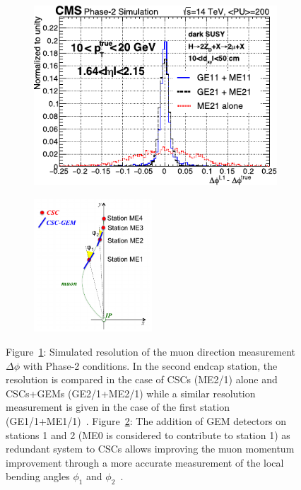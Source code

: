 	\begin{figure}[H]
		\begin{subfigure}{0.5\linewidth}
			\centering
			\includegraphics[width=.9\linewidth]{fig/chapt3/GEM-muon-direction.pdf}
			\caption{\label{fig:GEM-Muon:A}}
		\end{subfigure}
		\begin{subfigure}{0.5\linewidth}
			\centering
			\includegraphics[height=5cm]{fig/chapt3/GEM-muon-bending.png}
			\caption{\label{fig:GEM-Muon:B}}
		\end{subfigure}
		\caption{\label{fig:GEM-Muon} Figure~\ref{fig:GEM-Muon:A}: Simulated resolution of the muon direction measurement $\Delta\phi$ with Phase-2 conditions. In the second endcap station, the resolution is compared in the case of CSCs (ME2/1) alone and CSCs+GEMs (GE2/1+ME2/1) while a similar resolution measurement is given in the case of the first station (GE1/1+ME1/1)~\cite{PHASEIITP}. Figure~\ref{fig:GEM-Muon:B}: The addition of GEM detectors on stations 1 and 2 (ME0 is considered to contribute to station 1) as redundant system to CSCs allows improving the muon momentum improvement through a more accurate measurement of the local bending angles $\phi_1$ and $\phi_2$~\cite{PHASEIITP}.}
	\end{figure}
	
